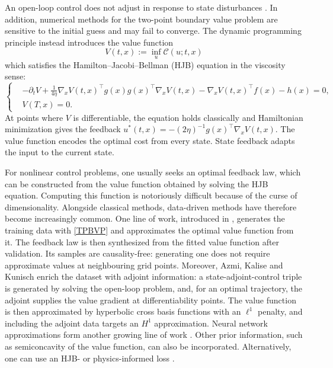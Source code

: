 \documentclass[11pt]{amsart}
\theoremstyle{definition}
\theoremstyle{remark}
\begin{document}
An open-loop control does not adjust in response to state disturbances \cite{azmi2021optimal}. In addition, numerical methods for the two-point boundary value problem are sensitive to the initial guess and may fail to converge.
The dynamic programming principle instead introduces the value function
\begin{equation*}
	V(t,x):=\inf_u\mathcal C(u;t,x)
\end{equation*}
which satisfies the Hamilton--Jacobi--Bellman (HJB) equation in the viscosity
sense:
\begin{equation*}
\tag{HJB}\label{HJB}
\left\{
\begin{aligned}
	& -\partial_t V + \frac{1}{4\eta} \nabla_x V(t, x)^\top g(x)g(x)^\top \nabla_x V(t, x)
	- \nabla_x V(t, x)^\top f(x) - h(x) = 0, \\
	& V(T, x) = 0.
\end{aligned}
\right.
\end{equation*}
At points where $V$ is differentiable, the equation holds classically and
Hamiltonian minimization gives the feedback
$u^*(t,x)=-(2\eta)^{-1}g(x)^\top\nabla_x V(t,x)$.
The value function encodes the optimal cost from every state.
State feedback adapts the input to the current state.

For nonlinear control problems, one usually seeks an optimal feedback law,
which can be constructed from the value function obtained by solving the HJB equation.
Computing this function is notoriously difficult because of the curse of dimensionality.
Alongside classical methods, data-driven methods have therefore become
increasingly common.
One line of work, introduced in \cite{nakamura2021adaptive}, generates the training data with \eqref{TPBVP} and approximates the optimal value function from it.
The feedback law is then synthesized from the fitted value function after validation.
Its samples are causality-free: generating one does not require approximate
values at neighbouring grid points.
Moreover, Azmi, Kalise and Kunisch \cite{azmi2021optimal} enrich the dataset
with adjoint information: a state-adjoint-control triple is generated by
solving the open-loop problem, and, for an optimal trajectory, the adjoint
supplies the value gradient at differentiability points.
The value function is then approximated by hyperbolic cross basis functions
with an $\ell^1$ penalty, and including the adjoint data targets an $H^1$
approximation. Neural network approximations form another growing line of work
\cite{lutter2020hjb, shilova2023revisiting}. Other prior information, such as
semiconcavity of the value function, can also be incorporated. Alternatively,
one can use an HJB- or physics-informed loss
\cite{doya2000reinforcement, munos1999gradient, raissi2019physics,
tassa2007least, liu2014neural}.\par
\end{document}
